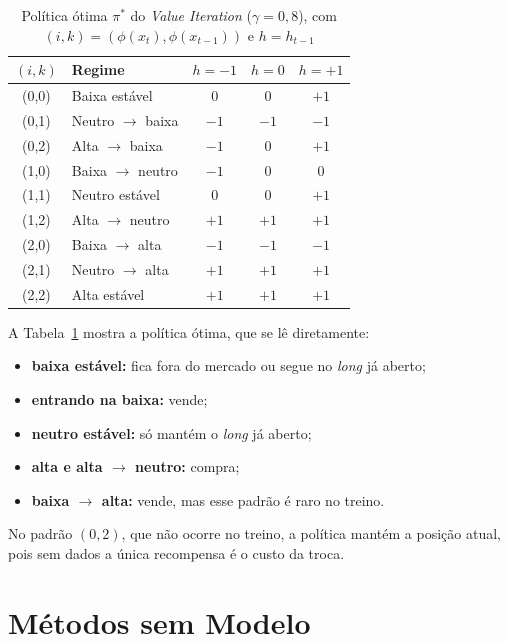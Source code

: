\documentclass[conference]{IEEEtran}
\begin{document}
\begin{table}[!t]
  \centering
  \caption{Política ótima $\pi^*$ do \textit{Value Iteration} ($\gamma = 0{,}8$), com $(i,k) = (\phi(x_t), \phi(x_{t-1}))$ e $h = h_{t-1}$}
  \label{tab:politica}
  \footnotesize
  \renewcommand{\arraystretch}{1.1}
  \begin{tabular}{c l ccc}
    \toprule
    $(i,k)$ & Regime & $h = -1$ & $h = 0$ & $h = +1$ \\
    \midrule
    (0,0) & Baixa estável        & $0$  & $0$  & $+1$ \\
    (0,1) & Neutro $\to$ baixa   & $-1$ & $-1$ & $-1$ \\
    (0,2) & Alta $\to$ baixa     & $-1$ & $0$  & $+1$ \\
    \midrule
    (1,0) & Baixa $\to$ neutro   & $-1$ & $0$  & $0$  \\
    (1,1) & Neutro estável       & $0$  & $0$  & $+1$ \\
    (1,2) & Alta $\to$ neutro    & $+1$ & $+1$ & $+1$ \\
    \midrule
    (2,0) & Baixa $\to$ alta     & $-1$ & $-1$ & $-1$ \\
    (2,1) & Neutro $\to$ alta    & $+1$ & $+1$ & $+1$ \\
    (2,2) & Alta estável         & $+1$ & $+1$ & $+1$ \\
    \bottomrule
  \end{tabular}
\end{table}

A Tabela~\ref{tab:politica} mostra a política ótima, que se lê diretamente:
\begin{itemize}
  \item \textbf{baixa estável:} fica fora do mercado ou segue no \textit{long} já aberto;
  \item \textbf{entrando na baixa:} vende;
  \item \textbf{neutro estável:} só mantém o \textit{long} já aberto;
  \item \textbf{alta e alta $\to$ neutro:} compra;
  \item \textbf{baixa $\to$ alta:} vende, mas esse padrão é raro no treino.
\end{itemize}
No padrão $(0,2)$, que não ocorre no treino, a política mantém a posição atual, pois sem dados a única recompensa é o custo da troca.

\section{Métodos sem Modelo}
\label{sec:modelfree}
\end{document}

